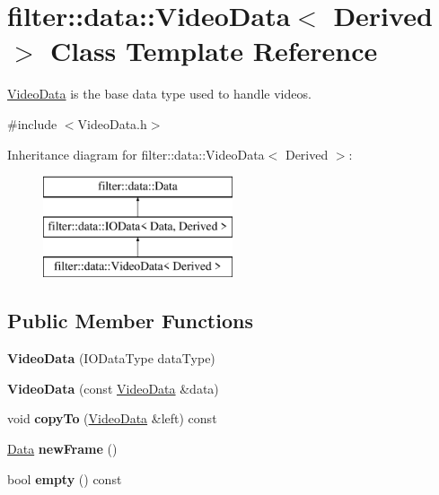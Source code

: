 \hypertarget{classfilter_1_1data_1_1_video_data}{}\section{filter\+:\+:data\+:\+:Video\+Data$<$ Derived $>$ Class Template Reference}
\label{classfilter_1_1data_1_1_video_data}


\hyperlink{classfilter_1_1data_1_1_video_data}{Video\+Data} is the base data type used to handle videos.  




{\ttfamily \#include $<$Video\+Data.\+h$>$}

Inheritance diagram for filter\+:\+:data\+:\+:Video\+Data$<$ Derived $>$\+:\begin{figure}[H]
\begin{center}
\leavevmode
\includegraphics[height=3.000000cm]{d2/dcc/classfilter_1_1data_1_1_video_data}
\end{center}
\end{figure}
\subsection*{Public Member Functions}
\begin{DoxyCompactItemize}
\item 
\mbox{\label{classfilter_1_1data_1_1_video_data_a6af66b8c3ec4a21b54713c9ca3acbd6e}} 
{\bfseries Video\+Data} (I\+O\+Data\+Type data\+Type)
\item 
\mbox{\label{classfilter_1_1data_1_1_video_data_a6624de73b2d3174471f7a084bb888ffa}} 
{\bfseries Video\+Data} (const \hyperlink{classfilter_1_1data_1_1_video_data}{Video\+Data} \&data)
\item 
\mbox{\label{classfilter_1_1data_1_1_video_data_a9a4ff204bf6909b883d5d5df426cea4c}} 
void {\bfseries copy\+To} (\hyperlink{classfilter_1_1data_1_1_video_data}{Video\+Data} \&left) const
\item 
\mbox{\label{classfilter_1_1data_1_1_video_data_a73c7765001cae9a87585ac4b76e00e57}} 
\hyperlink{classfilter_1_1data_1_1_data}{Data} {\bfseries new\+Frame} ()
\item 
\mbox{\label{classfilter_1_1data_1_1_video_data_a5ea2264f7a2d30704ccbd276c29d3456}} 
bool {\bfseries empty} () const
\end{DoxyCompactItemize}
